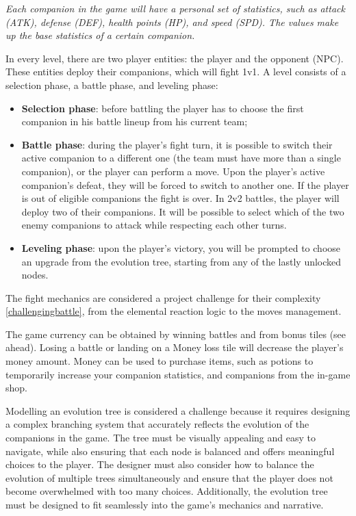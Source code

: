 \documentclass[12pt, a4paper]{report}
\begin{document}
    \textit{Each companion in the game will have a personal set of statistics, such as attack (ATK), defense (DEF), health points (HP), and speed (SPD).
    The values make up the base statistics of a certain companion.}

    In every level, there are two player entities: the player and the opponent (NPC). These entities deploy their companions, which will fight 1v1.
    A level consists of a selection phase, a battle phase, and leveling phase:
\begin{itemize}
    \item \textbf{Selection phase}: before battling the player has to choose the first companion in his battle lineup from his current team;
    \item \textbf{Battle phase}: during the player's fight turn, it is possible to switch their active companion to a different one (the team must have more than a single companion), 
        or the player can perform a move. Upon the player's active companion's defeat, they will be forced to switch to another one. 
        If the player is out of eligible companions the fight is over. In 2v2 battles, the player will deploy two of their companions. 
        It will be possible to select which of the two enemy companions to attack while respecting each other turns.
    \item \textbf{Leveling phase}: upon the player's victory, you will be prompted to choose an upgrade from the evolution tree, starting from any of the lastly unlocked nodes.
\end{itemize}

    The fight mechanics are considered a project challenge for their complexity \ref{challengingbattle}, from the elemental reaction logic to the moves management.

    The game currency can be obtained by winning battles and from bonus tiles (see ahead).
    Losing a battle or landing on a Money loss tile will decrease the player's money amount.
    Money can be used to purchase items, such as potions to temporarily increase your companion statistics, and companions from the in-game shop.

    Modelling an evolution tree is considered a challenge because it requires designing a complex branching system that accurately reflects the evolution of the companions in the game. 
    The tree must be visually appealing and easy to navigate, while also ensuring that each node is balanced and offers meaningful choices to the player. 
    The designer must also consider how to balance the evolution of multiple trees simultaneously and ensure that the player does not become overwhelmed with too many choices. 
    Additionally, the evolution tree must be designed to fit seamlessly into the game's mechanics and narrative.
\end{document}
